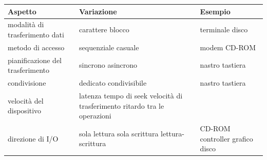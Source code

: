 \begin{table}[h!]
  \renewcommand{\arraystretch}{1.5}
  \centering
  \begin{tabular}{p{3.5cm} p{5.5cm} p{4.5cm}}
    \hline
    \textbf{Aspetto}                 & \textbf{Variazione}                                                                                  & \textbf{Esempio}                                  \\
    \hline
    modalità di trasferimento dati   & carattere \newline blocco                                                                            & terminale \newline disco                          \\
    metodo di accesso                & sequenziale \newline casuale                                                                         & modem \newline CD-ROM                             \\
    pianificazione del trasferimento & sincrono \newline asincrono                                                                          & nastro \newline tastiera                          \\
    condivisione                     & dedicato \newline condivisibile                                                                      & nastro \newline tastiera                          \\
    velocità del dispositivo         & latenza \newline tempo di seek \newline velocità di trasferimento \newline ritardo tra le operazioni &                                                   \\
    direzione di I/O                 & sola lettura \newline sola scrittura \newline lettura-scrittura                                      & CD-ROM \newline controller grafico \newline disco \\
    \hline
  \end{tabular}
\end{table}


